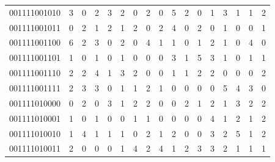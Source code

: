 \documentclass[10pt,a4paper]{article}
\begin{document}
\begin{longtable}{ |c|c|c|c|c|c|c|c|c|c|c|c|c|c|c|c|c| }
    001111001010              & 3                            & 0                                & 2                            & 3                              & 2   & 0   & 2   & 0   & 5   & 2   & 0   & 1   & 3   & 1   & 1   & 2   \\
    001111001011              & 0                            & 2                                & 1                            & 2                              & 1   & 2   & 0   & 2   & 4   & 0   & 2   & 0   & 1   & 0   & 0   & 1   \\
    001111001100              & 6                            & 2                                & 3                            & 0                              & 2   & 0   & 4   & 1   & 1   & 0   & 1   & 2   & 1   & 0   & 4   & 0   \\
    001111001101              & 1                            & 0                                & 1                            & 0                              & 1   & 0   & 0   & 0   & 3   & 1   & 5   & 3   & 1   & 0   & 1   & 1   \\
    001111001110              & 2                            & 2                                & 4                            & 1                              & 3   & 2   & 0   & 0   & 1   & 1   & 2   & 2   & 0   & 0   & 0   & 2   \\
    001111001111              & 2                            & 3                                & 3                            & 0                              & 1   & 1   & 2   & 1   & 0   & 0   & 0   & 0   & 5   & 4   & 3   & 0   \\
    001111010000              & 0                            & 2                                & 0                            & 3                              & 1   & 2   & 2   & 0   & 0   & 2   & 1   & 2   & 1   & 3   & 2   & 2   \\
    001111010001              & 1                            & 0                                & 1                            & 0                              & 0   & 1   & 1   & 0   & 0   & 0   & 0   & 4   & 1   & 2   & 1   & 2   \\
    001111010010              & 1                            & 4                                & 1                            & 1                              & 1   & 0   & 2   & 1   & 2   & 0   & 0   & 3   & 2   & 5   & 1   & 2   \\
    001111010011              & 2                            & 0                                & 0                            & 0                              & 1   & 4   & 2   & 4   & 1   & 2   & 3   & 3   & 2   & 1   & 1   & 1   \\

\end{longtable}
\end{document}
